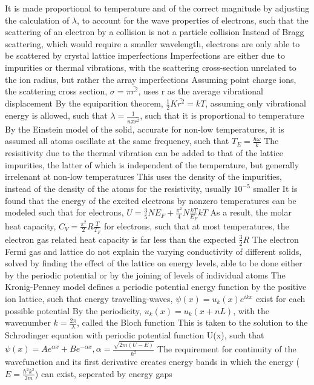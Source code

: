 \documentclass[11 pt, twoside]{article}
\newenvironment{outline*}
{
	\begin{outline}[enumerate]
	}
	{\end{outline}
}
\begin{document}
\begin{outline*}
	\2 It is made proportional to temperature and of the correct magnitude by adjusting the calculation of $\lambda$, to account for the wave properties of electrons, such that the scattering of an electron by a collision is not a particle collision
		\3 Instead of Bragg scattering, which would require a smaller wavelength, electrons are only able to be scattered by crystal lattice imperfections
		\3 Imperfections are either due to impurities or thermal vibrations, with the scattering cross-section unrelated to the ion radius, but rather the array imperfections
			\4 Assuming point charge ions, the scattering cross section, $\sigma = \pi \bar{r^2}$, uses r as the average vibrational displacement
			\4 By the equiparition theorem, $\frac{1}{2}K\bar{r^2} = kT$, assuming only vibrational energy is allowed, such that $\lambda = \frac{1}{n\pi\bar{r^2}}$, such that it is proportional to temperature
		\3 By the Einstein model of the solid, accurate for non-low temperatures, it is assumed all atoms oscillate at the same frequency, such that $T_E = \frac{\hbar\omega}{k}$
	\2 The resisitivity due to the thermal vibration can be added to that of the lattice impurities, the latter of which is independent of the temperature, but generally irrelenant at non-low temperatures
		\3 This uses the density of the impurities, instead of the density of the atoms for the resistivity, usually $10^{-5}$ smaller
	\2 It is found that the energy of the excited electrons by nonzero temperatures can be modeled such that for electrons, $U = \frac{3}{5}NE_F + \frac{\pi^2}{4} N \frac{kT}{E_F}kT$
		\3 As a result, the molar heat capacity, $C_V = \frac{\pi^2}{2}R\frac{T}{T_F}$ for electrons, such that at most temperatures, the electron gas related heat capacity is far less than the expected $\frac{3}{2}R$
\1 The electron Fermi gas and lattice do not explain the varying conductivity of different solids, solved by finding the effect of the lattice on energy levels, able to be done either by the periodic potential or by the joining of levels of individual atoms
	\2 The Kronig-Penney model defines a periodic potential energy function by the positive ion lattice, such that energy travelling-waves, $\psi(x) = u_k(x)e^{ikx}$ exist for each possible potential
		\3 By the periodicity, $u_k(x) = u_k(x + nL)$, with the wavenumber $k = \frac{2\pi}{\lambda}$, called the Bloch function
		\3 This is taken to the solution to the Schrodinger equation with periodic potential function U(x), such that $\psi(x) = Ae^{\alpha x} + Be^{-\alpha x}, \alpha = \frac{\sqrt{2m(U - E)}}{\hbar^2}$
		\3 The requirement for continuity of the wavefunction and its first derivative creates energy bands in which the energy ($E = \frac{\hbar^2k^2}{2m}$) can exist, seperated by energy gaps

\end{outline*}
\end{document}
